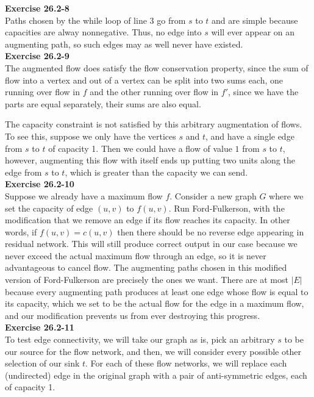 \documentclass{article}
\begin{document}
\noindent\textbf{Exercise 26.2-8}\\

Paths chosen by the while loop of line 3 go from $s$ to $t$ and are simple because capacities are alway nonnegative.  Thus, no edge into $s$ will ever appear on an augmenting path, so such edges may as well never have existed. \\

\noindent\textbf{Exercise 26.2-9}\\

The augmented flow does satisfy the flow conservation property, since the sum of flow into a vertex and out of a vertex can be split into two sums each, one running over flow in $f$ and the other running over flow in $f'$, since we have the parts are equal separately, their sums are also equal.

The capacity constraint is not satisfied by this arbitrary augmentation of flows. To see this, suppose we only have the vertices $s$ and $t$, and have a single edge from $s$ to $t$ of capacity 1. Then we could have a flow of value $1$ from $s$ to $t$, however, augmenting this flow with itself ends up putting two units along the edge from $s$ to $t$, which is greater than the capacity we can send.\\

\noindent\textbf{Exercise 26.2-10}\\ 

Suppose we already have a maximum flow $f$.   Consider a new graph $G$ where we set the capacity of edge $(u,v)$ to $f(u,v)$.  Run Ford-Fulkerson, with the modification that we remove an edge if its flow reaches its capacity.  In other words, if $f(u,v) = c(u,v)$ then there should be no reverse edge appearing in residual network.  This will still produce correct output in our case because we never exceed the actual maximum flow through an edge, so it is never advantageous to cancel flow.  The augmenting paths chosen in this modified version of Ford-Fulkerson are precisely the ones we want.  There are at most $|E|$ because every augmenting path produces at least one edge whose flow is equal to its capacity, which we set to be the actual flow for the edge in a maximum flow, and our modification prevents us from ever destroying this progress. \\

\noindent\textbf{Exercise 26.2-11}\\

To test edge connectivity, we will take our graph as is, pick an arbitrary $s$ to be our source for the flow network, and then, we will consider every possible other selection of our sink $t$. For each of these flow networks, we will replace each (undirected) edge in the original graph with a pair of anti-symmetric edges, each of capacity 1. 
\end{document}
